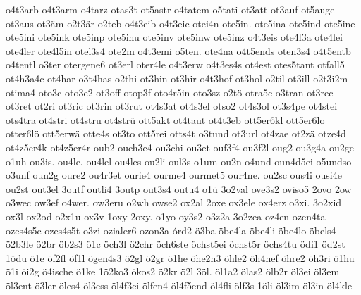 {    o4t3arb
    o4t3arm
    o4tarz
    otas3t
    ot5astr
    o4tatem
    o5tati
    ot3att
    ot3auf
    ot5auge
    ot3aus
    ot3äm
    o2t3är
    o2teb
    o4t3eib
    o4t3eic
    otei4n
    ote5in.
    ote5ina
    ote5ind
    ote5ine
    ote5ini
    ote5ink
    ote5inp
    ote5inu
    ote5inv
    ote5inw
    ote5inz
    o4t3eis
    ote4l3a
    ote4lei
    ote4ler
    ote4l5in
    otel3s4
    ote2m
    o4t3emi
    o5ten.
    ote4na
    o4t5ends
    oten3s4
    o4t5entb
    o4tentl
    o3ter
    otergene6
    ot3erl
    oter4le
    o4t3erw
    o4t3es4s
    ot4est
    otes5tant
    otfall5
    ot4h3a4c
    ot4har
    o3t4has
    o2thi
    ot3hin
    ot3hir
    o4t3hof
    ot3hol
    o2til
    ot3ill
    o2t3i2m
    otima4
    oto3c
    oto3e2
    ot3off
    otop3f
    oto4r5in
    oto3sz
    o2tö
    otra5c
    o3tran
    ot3rec
    ot3ret
    ot2ri
    ot3ric
    ot3rin
    ot3rut
    ot4s3at
    ot4s3el
    otso2
    ot4s3ol
    ot3s4pe
    ot4stei
    ots4tra
    ot4stri
    ot4stru
    ot4strü
    ott5akt
    ot4taut
    ot4t3eb
    ott5er6kl
    ott5er6lo
    otter6lö
    ott5erwä
    otte4s
    ot3to
    ott5rei
    otts4t
    o3tund
    ot3url
    ot4zae
    ot2zä
    otze4d
    ot4z5er4k
    ot4z5er4r
    oub2
    ouch3e4
    ou3chi
    ou3et
    ouf3f4
    ou3f2l
    oug2
    ou3g4a
    ou2ge
    o1uh
    ou3is.
    ou4le.
    ou4lel
    ou4les
    ou2li
    oul3s
    o1um
    ou2n
    o4und
    oun4d5ei
    o5undso
    o3unf
    oun2g
    oure2
    ou4r3et
    ourie4
    ourme4
    ourmet5
    our4ne.
    ou2sc
    ous4i
    ousi4e
    ou2st
    out3el
    3outf
    outli4
    3outp
    out3s4
    outu4
    o1ü
    3o2val
    ove3s2
    oviso5
    2ovo
    2ow
    o3wec
    ow3ef
    o4wer.
    ow3eru
    o2wh
    owse2
    ox2al
    2oxe
    ox3ele
    ox4erz
    o3xi.
    3o2xid
    ox3l
    ox2od
    o2x1u
    ox3v
    1oxy
    2oxy.
    o1yo
    oy3s2
    o3z2a
    3o2zea
    oz4en
    ozen4ta
    ozes4s5c
    ozes4s5t
    o3zi
    ozialer6
    ozon3a
    órd2
    ö3ba
    öbe4la
    öbe4li
    öbe4lo
    öbels4
    ö2b3le
    ö2br
    öb2s3
    ö1c
    öch3l
    ö2chr
    öch6ste
    öchst5ei
    öchst5r
    öchs4tu
    ödi1
    öd2st
    1ödu
    ö1e
    öf2fl
    öf1l
    ögen4s3
    ö2gl
    ö2gr
    ö1he
    öhe2n3
    öhle2
    öh4nef
    öhre2
    öh3ri
    ö1hu
    ö1i
    öi2g
    ö4ische
    ö1ke
    1ö2ko3
    ökos2
    ö2kr
    ö2l
    3öl.
    öl1a2
    ölas2
    ölb2r
    öl3ei
    öl3em
    öl3ent
    ö3ler
    öles4
    öl3ess
    öl4f3ei
    ölfen4
    öl4f5end
    öl4fli
    ölf3s
    1öli
    öl3im
    öl3in
    öl4kle
}
